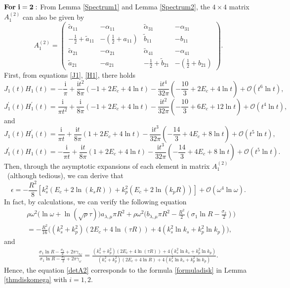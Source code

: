 \documentclass[10pt,reqno,oneside]{amsart}%
\theoremstyle{definition}
\theoremstyle{remark}
\numberwithin{equation}{section}
\numberwithin{equation}{section}
\begin{document}
$\bf{For \ i=2:}$ From Lemma \ref{Spectrum1} and Lemma \ref{Spectrum2}, the $4\times 4$ matrix $A_1^{(2)}$ can also be given by
\begin{equation}\label{A2}
A_1^{(2)}=
\begin{pmatrix}
\tilde{\alpha}_{11} & -{\alpha}_{11}&  \tilde{\alpha}_{31}&  - {\alpha}_{31}\\
-\frac{1}{2}+\tilde{a}_{11}  &-(\frac{1}{2}+a_{11}) & \tilde{b}_{11}  & -{b}_{11}\\
\tilde{\alpha}_{21} & -{\alpha}_{21}&  \tilde{\alpha}_{41}&  - {\alpha}_{41}\\
\tilde{a}_{21}& -{a}_{21}&  -\frac{1}{2}+\tilde{b}_{21}&-(\frac{1}{2}+b_{21})
\end{pmatrix}.%
\end{equation}
First, from equations \eqref{J1}, \eqref{H1}, there holds
$$
J_{1}(t)H_{1}(t)=-\frac{\mathrm{i}}{\pi}+\frac{\mathrm{i}t^2}{8\pi} \left(-1+2E_c+4\ln t\right)-\frac{\mathrm{i}t^4}{32\pi}\left(-\frac{10}{3}+2E_c+4\ln t\right)
+\mathcal{O}\left( t^6\ln t \right),
$$
$$
J_{1}^{\prime}(t) H_{1}^{\prime}(t)=\frac{\mathrm{i}}{\pi t^2}+\frac{\mathrm{i}}{8\pi} \left(-1+2E_c+4\ln t\right)-\frac{\mathrm{i}t^2}{32\pi}\left(-\frac{10}{3}+6E_c+12\ln t\right)
+\mathcal{O}\left(t^4\ln t \right),
$$
and
$$
J_{1}(t) H_{1}^{\prime}(t)=\frac{\mathrm{i}}{\pi t}+\frac{\mathrm{i}t}{8\pi} \left(1+2E_c+4\ln t\right)
-\frac{\mathrm{i}t^3}{32\pi}\left(-\frac{14}{3}+4E_c+8\ln t\right)
+\mathcal{O}\left(t^5\ln t \right),
$$
$$
J_{1}^{\prime}(t) H_{1}(t)=-\frac{\mathrm{i}}{\pi t}+\frac{\mathrm{i}t}{8\pi} \left(1+2E_c+4\ln t\right)
-\frac{\mathrm{i}t^3}{32\pi}\left(-\frac{14}{3}+4E_c+8\ln t\right)
+\mathcal{O}\left(t^5\ln t \right).
$$
Then, through the asymptotic expansions of each element in matrix $A_1^{(2)}$~(although tedious), we can derive that
\begin{equation}\label{detA2}
\epsilon=-\frac{R^2}{8}\left[k_s^2\left(E_c+2\ln({k_sR})\right)+k_p^2\left(E_c+2\ln({k_pR})\right)\right]+\mathcal{O}\left(\omega^4\ln \omega \right).
\end{equation}
In fact, by calculations, we can verify the following equation
\begin{align}
&\rho\omega^2\Big(\ln\omega+\ln{(\sqrt{\rho}\tau)}\Big){a}_{\lambda,\mu}\pi R^2 +\rho\omega^2\Big({b}_{\lambda,\mu}\pi R^2-\frac{R^2}{2}(\sigma_{1}\ln{R}-\frac{\sigma_2}{2})\Big) \nonumber \\
&=-\frac{R^2}{16}\Big((k_s^2+k_p^2)\left(2E_c+4\ln({\tau R})\right)+4\left(k_s^2\ln{k_s}+k_p^2\ln{k_p}\right)\Big),\nonumber
\end{align}
and
\begin{align}
\frac{\sigma_{1}\ln{R}-\frac{\sigma_2}{2}+2\pi \gamma_{\tau\omega}}{\sigma_{1}\ln{R}-\frac{\sigma_2}{2}+2\pi \gamma_{\omega}}=\frac{(k_s^2+k_p^2)\left(2E_c+4\ln({\tau R})\right)+4\left(k_s^2\ln{k_s}+k_p^2\ln{k_p}\right)}{(k_s^2+k_p^2)\left(2E_c+4\ln{ R}\right)+4\left(k_s^2\ln{k_s}+k_p^2\ln{k_p}\right)}.\nonumber
\end{align}
Hence, the equation \eqref{detA2} corresponds to the formula \eqref{formuladisk} in Lemma \ref{thmdiskomega} with $i=1,2$.
\end{document}

